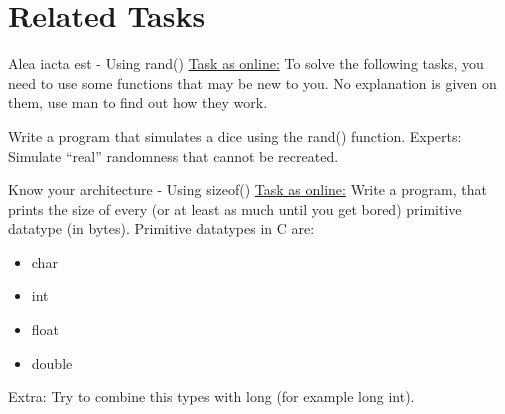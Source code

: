 \section{Related Tasks}

\begin{frame}{Alea iacta est - Using rand()}
    \href{http://fsr.github.io/c-lessons/exercises/14_alea_iacta_est.html}{Task as online:} \newline
    To solve the following tasks, you need to use some functions that may be new to you.
    No explanation is given on them, use man to find out how they work.

    Write a program that simulates a dice using the rand() function.
    \newline 
    \newline
    Experts: Simulate “real” randomness that cannot be recreated.
\end{frame}

\begin{frame}{Know your architecture - Using sizeof()}
    \href{http://fsr.github.io/c-lessons/exercises/15_know_your_architecture.html}{Task as online:} \newline
    Write a program, that prints the size of every (or at least as much until you get bored) primitive datatype (in bytes).
    Primitive datatypes in C are:
    \begin{itemize}
     \item char
     \item int
     \item float
     \item double
    \end{itemize}

    Extra: Try to combine this types with long (for example long int).
\end{frame}

